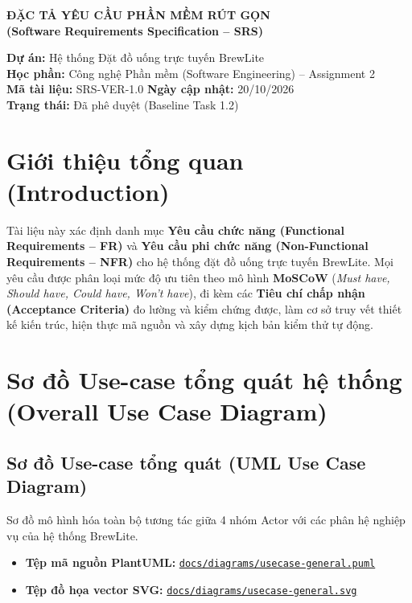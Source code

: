\documentclass[12pt,a4paper]{article}
\begin{document}
\begin{center}
    {\LARGE \textbf{\textcolor{brandblue}{ĐẶC TẢ YÊU CẦU PHẦN MỀM RÚT GỌN}}}\\[0.3cm]
    {\large \textbf{(Software Requirements Specification -- SRS)}}\\[0.4cm]
    \begin{tcolorbox}[colback=lightgray,colframe=brandblue,arc=3mm,width=0.95\textwidth]
        \small
        \textbf{Dự án:} Hệ thống Đặt đồ uống trực tuyến BrewLite\\
        \textbf{Học phần:} Công nghệ Phần mềm (Software Engineering) -- Assignment 2\\
        \textbf{Mã tài liệu:} SRS-VER-1.0 \hfill \textbf{Ngày cập nhật:} 20/10/2026\\
        \textbf{Trạng thái:} Đã phê duyệt (Baseline Task 1.2)
    \end{tcolorbox}
\end{center}

\vspace{0.2cm}

\section{Giới thiệu tổng quan (Introduction)}
Tài liệu này xác định danh mục \textbf{Yêu cầu chức năng (Functional Requirements -- FR)} và \textbf{Yêu cầu phi chức năng (Non-Functional Requirements -- NFR)} cho hệ thống đặt đồ uống trực tuyến BrewLite. Mọi yêu cầu được phân loại mức độ ưu tiên theo mô hình \textbf{MoSCoW} (\textit{Must have, Should have, Could have, Won't have}), đi kèm các \textbf{Tiêu chí chấp nhận (Acceptance Criteria)} đo lường và kiểm chứng được, làm cơ sở truy vết thiết kế kiến trúc, hiện thực mã nguồn và xây dựng kịch bản kiểm thử tự động.

\section{Sơ đồ Use-case tổng quát hệ thống (Overall Use Case Diagram)}

\subsection{Sơ đồ Use-case tổng quát (UML Use Case Diagram)}
Sơ đồ mô hình hóa toàn bộ tương tác giữa 4 nhóm Actor với các phân hệ nghiệp vụ của hệ thống BrewLite.

\begin{itemize}[leftmargin=*,itemsep=1pt]
    \item \textbf{Tệp mã nguồn PlantUML:} \href{run:../diagrams/usecase-general.puml}{\texttt{docs/diagrams/usecase-general.puml}}
    \item \textbf{Tệp đồ họa vector SVG:} \href{run:../diagrams/usecase-general.svg}{\texttt{docs/diagrams/usecase-general.svg}}
\end{itemize}
\end{document}
